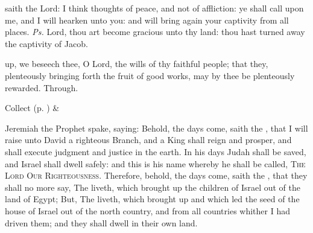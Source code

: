 
\introit
{} saith the Lord: I think thoughts of peace, and not of affliction: ye shall call upon me, and I will hearken unto you: and will bring again your captivity from all places. \textit{Ps.} Lord, thou art become gracious unto thy land: thou hast turned away the captivity of Jacob.

\collect
{} up, we beseech thee, O Lord, the wills of thy faithful people; that they, plenteously bringing forth the fruit of good works, may by thee be plenteously rewarded. Through.
\begin{rubric}
     Collect  (p. \pageref{SPSaints}) \&  
\end{rubric}

 Jeremiah the Prophet spake, saying: Behold, the days come, saith the , that I will raise unto David a righteous Branch, and a King shall reign and prosper, and shall execute judgment and justice in the earth. In his days Judah shall be saved, and Israel shall dwell safely: and this is his name whereby he shall be called, \textsc{The Lord Our Righteousness}. Therefore, behold, the days come, saith the , that they shall no more say, The  liveth, which brought up the children of Israel out of the land of Egypt; But, The  liveth, which brought up and which led the seed of the house of Israel out of the north country, and from all countries whither I had driven them; and they shall dwell in their own land.



